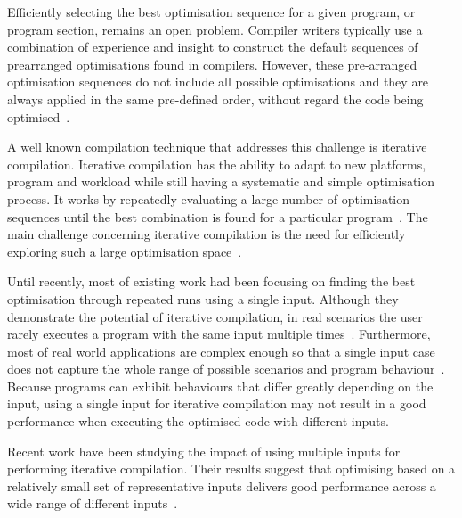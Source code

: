 \documentclass[sigplan,10pt]{acmart}
\theoremstyle{definition}
\newcommand{\itercomp}{{iterative compilation}}
\newcommand{\Itercomp}{{Iterative compilation}}
\begin{document}
Efficiently selecting the best optimisation sequence for a given program, or program section, remains an open problem.
Compiler writers typically use a combination of experience and insight to construct the default sequences of prearranged optimisations found in compilers.
However, these pre-arranged optimisation sequences do not include all possible optimisations and they are always applied in the same pre-defined order, without regard the code being optimised~\cite{pan06,cavazos07,zhou12,kulkarni12}.

A well known compilation technique that addresses this challenge is {\itercomp}.
{\Itercomp} has the ability to adapt to new platforms, program and workload while still having a systematic and simple optimisation process.
It works by repeatedly evaluating a large number of optimisation sequences until the best combination is found for a particular program~\cite{fursin07,chen10}.
The main challenge concerning {\itercomp} is the need for efficiently exploring such a large optimisation space~\cite{fursin07,cavazos07,zhou12}.

Until recently, most of existing work  had been focusing on finding the best optimisation through repeated runs using a single input.
Although they demonstrate the potential of {\itercomp}, in real scenarios the user rarely executes a program with the same input multiple times~\cite{bodin98,kisuki99,stephenson03,kulkarni04,agakov06}.
Furthermore, most of real world applications are complex enough so that a single input case does not capture the whole range of possible scenarios and program behaviour~\cite{haneda06,fursin07,chen10,chen12a}.
Because programs can exhibit behaviours that differ greatly depending on the input,
using a single input for {\itercomp} may not result in a good performance when executing the optimised code with different inputs.


Recent work have been studying the impact of using multiple inputs for
performing {\itercomp}.
Their results suggest that optimising based on a relatively small set of
representative inputs delivers good performance across a wide range of different
inputs~\cite{haneda06,fursin07,chen10,chen12a,chen12b,fang15,mpeis16}.
\end{document}
